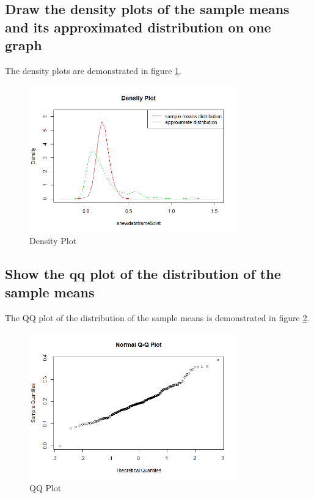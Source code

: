 \documentclass{zjureport}
\begin{document}
\subsection{Draw the density plots of the sample means and its approximated distribution on one graph}
The density plots are demonstrated in figure \ref{density plots}.
\begin{figure}[!ht]
	\centering
	\includegraphics[width=0.8\textwidth]{Rplot01.png}
	\caption{Density Plot}
	\label{density plots}
\end{figure}


\subsection{Show the qq plot of the distribution of the sample means}
	The QQ plot of the distribution of the sample means is demonstrated in figure \ref{QQ plot}.
\begin{figure}[!ht]
	\centering
	\includegraphics[width=0.8\textwidth]{Rplot02.png}
	\caption{QQ Plot}
	\label{QQ plot}
\end{figure}
\end{document}
